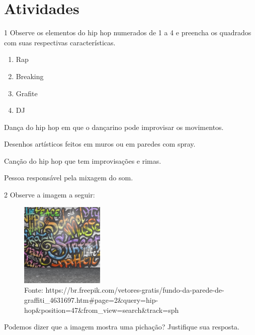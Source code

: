 \section{Atividades}

\num{1} Observe os elementos do hip hop numerados de 1 a 4 e preencha os quadrados com suas respectivas características.

\begin{enumerate}
\item Rap

\item Breaking

\item Grafite

\item DJ
\end{enumerate}

\begin{boxlist}
 Dança do hip hop em que o dançarino pode improvisar os movimentos.

 Desenhos artísticos feitos em muros ou em paredes com spray.

 Canção do hip hop que tem improvisações e rimas.

 Pessoa responsável pela mixagem do som.
\end{boxlist}


\num{2} Observe a imagem a seguir:

\begin{figure}[htpb!]
\includegraphics[width=1.57407in,height=1.57407in]{./imgs/img3.jpg}
\caption{Fonte: https://br.freepik.com/vetores-gratis/fundo-da-parede-de-graffiti\_4631697.htm\#page=2\&query=hip-hop\&position=47\&from\_view=search\&track=sph}
\end{figure}

Podemos dizer que a imagem mostra uma pichação? Justifique sua resposta.



